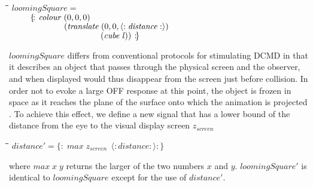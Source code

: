 \documentclass[11pt]{article}
\newlength{\lwidth}\setlength{\lwidth}{4.5cm}
\newlength{\cwidth}\setlength{\cwidth}{8mm} %
\newcommand{\Varid}[1]{\mathit{#1}}
\begin{document}
\begin{tabbing}
\qquad\=\hspace{\lwidth}\=\hspace{\cwidth}\=\+\kill
${\Varid{loomingSquare}\mathrel{=}}$\\
${\hskip2.50em\relax\{\!:\!\;\Varid{colour}\;(\mathrm{0},\mathrm{0},\mathrm{0})\;}$\\
${\hskip2.50em\relax\phantom{\{\!:\!\;\Varid{colour}\;\mbox{}}(\Varid{translate}\;(\mathrm{0},\mathrm{0},\langle:\Varid{distance}:\rangle)\;}$\\
${\hskip2.50em\relax\phantom{\{\!:\!\;\Varid{colour}\;\mbox{}}\phantom{(\Varid{translate}\;\mbox{}}(\Varid{cube}\;\Varid{l}))\;\!:\!\}}$
\end{tabbing}
\ensuremath{\Varid{loomingSquare}} differs from conventional protocols
\citep{Gabbiani2001} for stimulating DCMD in that it describes an
object that passes through the physical screen and the observer, and
when displayed would thus disappear from the screen just before
collision. In order not to evoke a large OFF response
\citep{O'shea1976} at this point, the object
is frozen in space as it reaches the plane of the surface onto which
the animation is projected \citep{Hatsopoulos1995}. To achieve this
effect, we define a new signal that has a lower bound of the distance
from the eye to the visual display screen \ensuremath{z_{screen}}
\begin{tabbing}
\qquad\=\hspace{\lwidth}\=\hspace{\cwidth}\=\+\kill
${\Varid{distance'}\mathrel{=}\{\!:\!\;\Varid{max}\;z_{screen}\;\,\langle:\Varid{distance}:\rangle\!:\!\}}$
\end{tabbing}where \ensuremath{\Varid{max}\;\Varid{x}\;\Varid{y}} returns the larger of the two numbers \ensuremath{\Varid{x}} and
\ensuremath{\Varid{y}}. \ensuremath{\Varid{loomingSquare'}} is identical to \ensuremath{\Varid{loomingSquare}} except for the
use of \ensuremath{\Varid{distance'}}.
\end{document}
